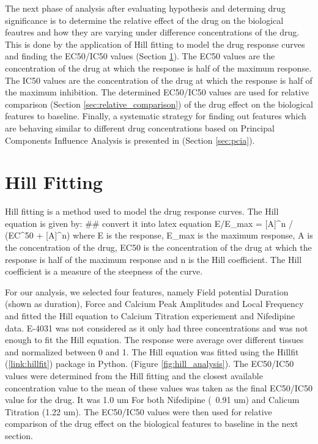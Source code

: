 The next phase of analysis after evaluating hypothesis and determing drug significance 
is to determine the relative effect of the drug on the biological feautres and 
how they are varying under difference concentrations of the drug. This is done by the application
of Hill fitting to model the drug response curves and finding the EC50/IC50 values (Section \ref{sec:hillfitting}). The EC50 values
are the concentration of the drug at which the response is half of the maximum response. The IC50 values
are the concentration of the drug at which the response is half of the maximum inhibition.
The determined EC50/IC50 values are used for relative comparison (Section \ref{sec:relative_comparison}) of the drug effect on the biological features to baseline.
Finally, a systematic strategy for finding out features which are behaving similar to different drug concentrations based on 
Principal Components Influence Analysis is presented in (Section \ref{sec:pcia}).


\section {Hill Fitting}
\label{sec:hillfitting}
Hill fitting is a method used to model the drug response curves. The Hill equation is given by:
## convert it into latex equation
E/E_max = [A]^n / (EC^50 + [A]^n)
where E is the response, E_max is the maximum response, A is the concentration of the drug, EC50 is the concentration of the drug at which the response is half of the maximum response and n is the Hill coefficient. The Hill coefficient is a measure of the steepness of the curve. 

For our analysis, we selected four features, namely Field potential Duration (shown as duration), Force and Calcium Peak Amplitudes and Local Frequency and fitted the 
Hill equation to Calcium Titration experiement and Nifedipine data. E-4031 was not considered as it only had three concentrations and was not enough to fit the Hill equation. 
The response were average over different tissues and normalized between 0 and 1. The Hill equation was fitted using the Hillfit (\ref{link:hillfit}) package in Python. (Figure \ref{fig:hill_analysis}).
The EC50/IC50 values were determined from the Hill fitting and the closest available concentration value to the mean of these values was taken as the final EC50/IC50 value for the drug. It was 1.0 um For both Nifedipine (~0.91 um) and Calicum Titration (1.22 um). The EC50/IC50 values were then used for relative comparison of the drug effect on the biological features to baseline in the next section.

